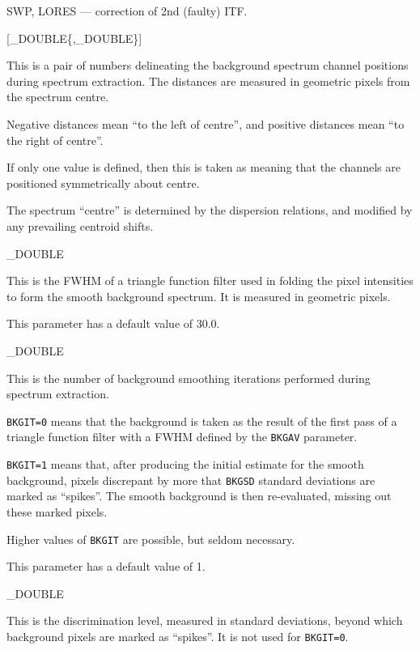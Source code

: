 {{   \begin {description}
      \item SWP, LORES --- correction of 2nd (faulty) ITF.
   \end {description}
}

{
   [\_DOUBLE\{,\_DOUBLE\}]
}{
   This is a pair of numbers delineating the background spectrum channel
   positions during spectrum extraction.
   The distances are measured in geometric pixels from the spectrum centre.

   Negative distances mean ``to the left of centre'', and positive distances
   mean ``to the right of centre''.

   If only one value is defined, then this is taken as meaning
   that the channels are positioned symmetrically
   about centre.

   The spectrum ``centre'' is determined by the dispersion relations, and
   modified by any prevailing centroid shifts.
}

{
   \_DOUBLE
}{
   This is the FWHM of a triangle function filter used in folding the
   pixel intensities to form the smooth background spectrum.
   It is measured in geometric pixels.

   This parameter has a default value of 30.0.
}

{
   \_DOUBLE
}{
   This is the number of background smoothing iterations performed during
   spectrum extraction.

   \begin {description}
      \item \verb+BKGIT=0+ means that the background is taken as the result of
      the first pass of a triangle function filter with a FWHM defined by
      the \verb+BKGAV+ parameter.

      \item \verb+BKGIT=1+ means that, after producing the initial estimate for
      the smooth background, pixels discrepant by more that \verb+BKGSD+
      standard deviations are marked as ``spikes''.
      The smooth background is then re-evaluated, missing out these marked
      pixels.
   \end {description}

   Higher values of \verb+BKGIT+ are possible, but seldom necessary.

   This parameter has a default value of 1.
}

{
   \_DOUBLE
}{
   This is the discrimination level, measured in standard deviations,
   beyond which background pixels are marked as ``spikes''.
   It is not used for \verb+BKGIT=0+.

}}
